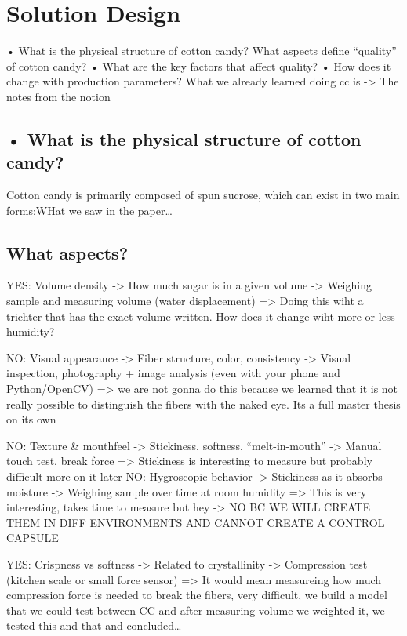 \chapter{Solution Design}
\label{sec:solution}

    •	What is the physical structure of cotton candy?
    What aspects define “quality” of cotton candy?     •	What are the key factors that affect quality?
    •	How does it change with production parameters?
    What we already learned doing cc is -> The notes from the notion

\section{    •	What is the physical structure of cotton candy?}
Cotton candy is primarily composed of spun sucrose, which can exist in two main forms:WHat we saw in the paper\dots

\section{What aspects?}

YES: Volume density -> How much sugar is in a given volume -> Weighing sample and measuring volume (water displacement) => Doing this wiht a trichter that has the exact volume written. How does it change wiht more or less humidity?

NO: Visual appearance -> Fiber structure, color, consistency -> Visual inspection, photography + image analysis (even with your phone and Python/OpenCV) => we are not gonna do this because we learned that it is not really possible to distinguish the fibers with the naked eye. Its a full master thesis on its own

NO: Texture \& mouthfeel -> Stickiness, softness, “melt-in-mouth” -> Manual touch test, break force => Stickiness is interesting to measure but probably difficult more on it later 
NO: Hygroscopic behavior -> Stickiness as it absorbs moisture -> Weighing sample over time at room humidity => This is very interesting, takes time to measure but hey -> NO BC WE WILL CREATE THEM IN DIFF ENVIRONMENTS AND CANNOT CREATE A CONTROL CAPSULE

YES: Crispness vs softness -> Related to crystallinity -> Compression test (kitchen scale or small force sensor) => It would mean measureing how much compression force is needed to break the fibers, very difficult, we build a model that we could test between CC and after measuring volume we weighted it, we tested this and that and concluded\dots

